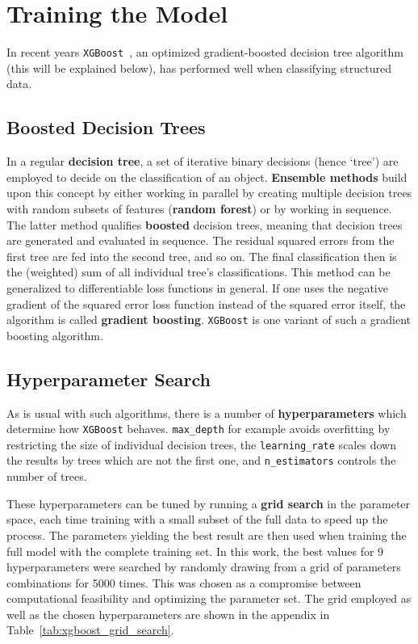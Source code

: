 \section{Training the Model}
In recent years \texttt{XGBoost}~, an optimized gradient-boosted decision tree algorithm (this will be explained below), has performed well when classifying structured data.

\subsection{Boosted Decision Trees}
In a regular \textbf{decision tree}, a set of iterative binary decisions (hence `tree') are employed to decide on the classification of an object. \textbf{Ensemble methods} build upon this concept by either working in parallel by creating multiple decision trees with random subsets of features (\textbf{random forest}) or by working in sequence. The latter method qualifies \textbf{boosted} decision trees, meaning that decision trees are generated and evaluated in sequence. The residual squared errors from the first tree are fed into the second tree, and so on. The final classification then is the (weighted) sum of all individual tree's classifications. This method can be generalized to differentiable loss functions in general. If one uses the negative gradient of the squared error loss function instead of the squared error itself, the algorithm is called \textbf{gradient boosting}. \texttt{XGBoost} is one variant of such a gradient boosting algorithm.

\subsection{Hyperparameter Search}
As is usual with such algorithms, there is a number of \textbf{hyperparameters} which determine how \texttt{XGBoost} behaves. \texttt{max\_depth} for example avoids overfitting by restricting the size of individual decision trees, the \texttt{learning\_rate} scales down the results by trees which are not the first one, and \texttt{n\_estimators} controls the number of trees.

These hyperparameters can be tuned by running a \textbf{grid search} in the parameter space, each time training with a small subset of the full data to speed up the process. The parameters yielding the best result are then used when training the full model with the complete training set. In this work, the best values for 9 hyperparameters were searched by randomly drawing from a grid of parameters combinations for 5000 times. This was chosen as a compromise between computational feasibility and optimizing the parameter set. The grid employed as well as the chosen hyperparameters are shown in the appendix in Table~\ref{tab:xgboost_grid_search}.

